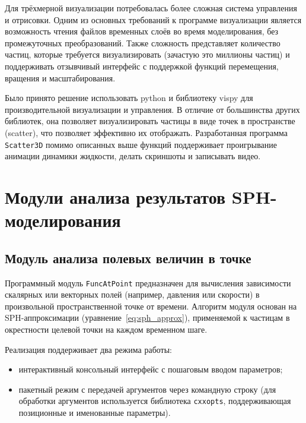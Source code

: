 Для трёхмерной визуализации потребовалась более сложная система управления и отрисовки.
%
Одним из основных требований к программе визуализации является возможность чтения файлов временных слоёв
во время моделирования, без промежуточных преобразований.
%
Также сложность представляет количество частиц, которые требуется визуализировать (зачастую это миллионы частиц) и
поддерживать отзывчивый интерфейс с поддержкой функций перемещения, вращения и масштабирования.

Было принято решение использовать python и библиотеку vispy для производительной визуализации и управления.
%
В отличие от большинства других библиотек, она позволяет визуализировать частицы в виде точек в пространстве (scatter),
что позволяет эффективно их отображать.
%
Разработанная программа \verb|Scatter3D| помимо описанных выше функций поддерживает проигрывание анимации динамики жидкости, 
делать скриншоты и записывать видео.

\section{Модули анализа результатов SPH-моделирования}

\subsection{Модуль анализа полевых величин в точке}

Программный модуль \verb|FuncAtPoint| предназначен для вычисления зависимости скалярных или векторных полей 
(например, давления или скорости)
в произвольной пространственной точке от времени.
%
Алгоритм модуля основан на SPH-аппроксимации (уравнение~\ref{eq:sph_approx}), 
применяемой к частицам в окрестности целевой точки на каждом временном шаге.

Реализация поддерживает два режима работы:
\begin{itemize}
    \item интерактивный консольный интерфейс с пошаговым вводом параметров;
    \item пакетный режим с передачей аргументов через командную строку (для обработки аргументов используется
    библиотека \verb|cxxopts|, поддерживающая позиционные и именованные параметры).
\end{itemize}

